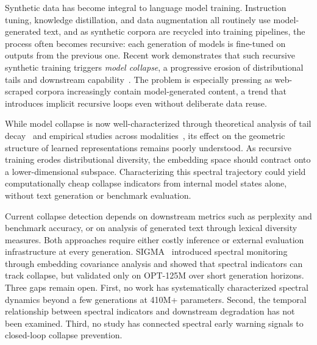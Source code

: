 
Synthetic data has become integral to language model training.
Instruction tuning, knowledge distillation, and data augmentation all routinely use model-generated text, and as synthetic corpora are recycled into training pipelines, the process often becomes recursive: each generation of models is fine-tuned on outputs from the previous one.
Recent work demonstrates that such recursive synthetic training triggers \textit{model collapse}, a progressive erosion of distributional tails and downstream capability~\cite{shumailov2024collapse, dohmatob2024tails, alemohammad2024mad}.
The problem is especially pressing as web-scraped corpora increasingly contain model-generated content, a trend that introduces implicit recursive loops even without deliberate data reuse.

While model collapse is now well-characterized through theoretical analysis of tail decay~\cite{dohmatob2024tails} and empirical studies across modalities~\cite{shumailov2024collapse, alemohammad2024mad}, its effect on the geometric structure of learned representations remains poorly understood.
As recursive training erodes distributional diversity, the embedding space should contract onto a lower-dimensional subspace.
Characterizing this spectral trajectory could yield computationally cheap collapse indicators from internal model states alone, without text generation or benchmark evaluation.

Current collapse detection depends on downstream metrics such as perplexity and benchmark accuracy, or on analysis of generated text through lexical diversity measures.
Both approaches require either costly inference or external evaluation infrastructure at every generation.
SIGMA~\cite{gu2026sigma} introduced spectral monitoring through embedding covariance analysis and showed that spectral indicators can track collapse, but validated only on OPT-125M over short generation horizons.
Three gaps remain open.
First, no work has systematically characterized spectral dynamics beyond a few generations at 410M+ parameters.
Second, the temporal relationship between spectral indicators and downstream degradation has not been examined.
Third, no study has connected spectral early warning signals to closed-loop collapse prevention.

